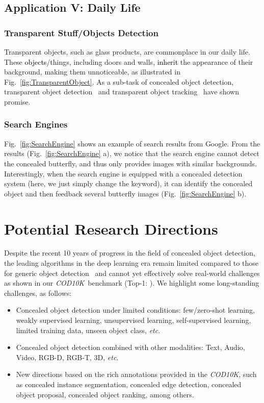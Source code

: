 \documentclass[10pt,journal,compsoc]{IEEEtran}
\def\etc{\emph{etc}}
\newcommand{\figref}[1]{Fig.~\ref{#1}}
\newcommand{\Rev}[1]{\textcolor{black}{#1}}
\def\ourdataset{\textit{COD10K}}
\begin{document}
\subsection{Application V: Daily Life}
\subsubsection{Transparent Stuff/Objects Detection}

Transparent objects, such as glass products, are commonplace in our daily life. 
These \Rev{objects}/things, including doors and walls, 
\Rev{inherit} the appearance of their background, making them unnoticeable, 
as illustrated in \figref{fig:TransparentObject}. 
As a sub-task of concealed object detection, 
transparent object detection~\cite{xie2020segmenting} and 
transparent object tracking~\cite{fan2020transparent} have shown promise.

\subsubsection{Search Engines}
\figref{fig:SearchEngine} shows an example of search results from Google.
From the results (\figref{fig:SearchEngine} a), 
we notice that the search engine cannot detect
the concealed butterfly, and thus only provides images with similar backgrounds.
Interestingly, when the search engine is equipped with a concealed 
detection system (here, we just simply change the keyword),
it can identify the concealed object and then feedback several butterfly images 
(\figref{fig:SearchEngine} b).




\section{Potential Research Directions}\label{sec:Future}

Despite the recent 10 years of progress in the field of concealed object 
detection, 
the leading algorithms in the deep learning era remain limited compared to 
those for generic object detection~\cite{liu2020deep} and cannot yet 
effectively solve real-world challenges as shown in our \ourdataset~benchmark 
(Top-1: ). 
We highlight some long-standing challenges, as follows:
\begin{itemize}
\item Concealed object detection under limited conditions: 
few/zero-shot learning, weakly supervised learning, unsupervised learning, 
self-supervised learning, limited training data, unseen object class, \etc.

\item Concealed object detection combined with other modalities: 
Text, Audio, Video, RGB-D, RGB-T, 3D, \etc.

\item New directions based on the rich annotations provided in the \ourdataset,
such as concealed instance segmentation, concealed edge detection, 
concealed object proposal, concealed object ranking, among others.

\end{itemize}
\end{document}
